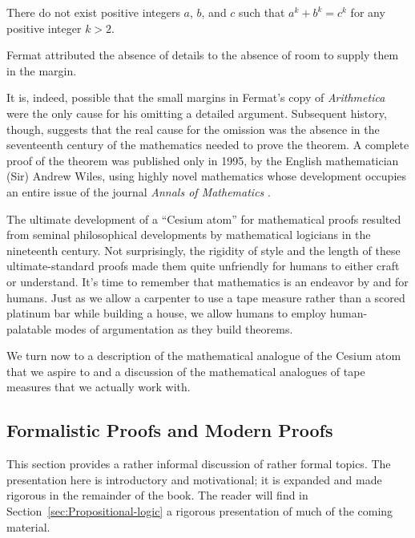 {\begin{minipage}{0.96\textwidth}
\begin{theorem}
\label{thm:Fermat-last}
There do not exist positive integers $a$, $b$, and $c$ such that $a^k + b^k = c^k$ for any positive integer $k >2$.
\end{theorem}

Fermat attributed the absence of details to the absence of room to supply them in the margin.

\smallskip

It is, indeed, possible that the small margins in Fermat's copy of {\it Arithmetica} were the only cause for his omitting a detailed argument.  Subsequent history, though, suggests that the real cause for the omission was the absence in the seventeenth century of the mathematics needed to prove the theorem.  A complete proof of the theorem was published only in 1995, by the English mathematician (Sir) Andrew Wiles, using highly novel mathematics whose development occupies an entire issue of the journal {\it Annals of Mathematics} \cite{Wiles95}.
\end{minipage}
}
\bigskip

The ultimate development of a ``Cesium atom'' for mathematical proofs resulted from seminal philosophical developments by mathematical logicians in the nineteenth century.  Not surprisingly, the rigidity of style and the length of these ultimate-standard proofs made them quite unfriendly for humans to either craft or understand.  It's time to remember that mathematics is an endeavor by and for humans.  Just as we allow a carpenter to use a tape measure rather than a scored platinum bar while building a house, we allow humans to employ human-palatable modes of argumentation as they build theorems.

\smallskip

We turn now to a description of the mathematical analogue of the Cesium atom that we aspire to and a discussion of the mathematical analogues of tape measures that we actually work with.


\subsection{Formalistic Proofs and Modern Proofs}
\label{sec:classical-v-modern-proofs}

This section provides a rather informal discussion of rather formal topics.  The presentation here is introductory and motivational; it is expanded and made rigorous in the remainder of the book.  The reader will find in Section~\ref{sec:Propositional-logic} a rigorous presentation of much of the coming material.

